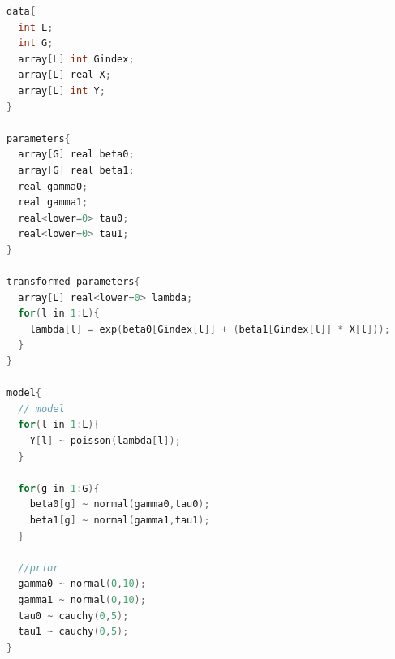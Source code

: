 \begin{lstlisting}[language=C++,label={stan::25_02},caption={階層ポアソン回帰モデル}]
data{
  int L;
  int G;
  array[L] int Gindex;
  array[L] real X;
  array[L] int Y;
}

parameters{
  array[G] real beta0;
  array[G] real beta1;
  real gamma0;
  real gamma1;
  real<lower=0> tau0;
  real<lower=0> tau1;
}

transformed parameters{
  array[L] real<lower=0> lambda;
  for(l in 1:L){
    lambda[l] = exp(beta0[Gindex[l]] + (beta1[Gindex[l]] * X[l]));
  }
}

model{
  // model
  for(l in 1:L){
    Y[l] ~ poisson(lambda[l]);
  }
  
  for(g in 1:G){
    beta0[g] ~ normal(gamma0,tau0);
    beta1[g] ~ normal(gamma1,tau1);
  }
  
  //prior
  gamma0 ~ normal(0,10);
  gamma1 ~ normal(0,10);
  tau0 ~ cauchy(0,5);
  tau1 ~ cauchy(0,5);
}
\end{lstlisting}
